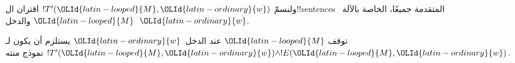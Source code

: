 \documentclass[../../../include/open-logic-section]{subfiles}
\begin{document}
\begin{enumerate}
\end{enumerate}
ولنسمّ $!T'({\OLId{latin-looped}{M}},{\OLId{latin-ordinary}{w}})$ اقتران ال!!{sentence}s المتقدمة جميعًا،
الخاصة بالآلة~${\OLId{latin-looped}{M}}$ والدخل~${\OLId{latin-ordinary}{w}}$.

\begin{lem}
  توقف ${\OLId{latin-looped}{M}}$ عند الدخل~${\OLId{latin-ordinary}{w}}$ يستلزم أن يكون لـ
  $!T'({\OLId{latin-looped}{M}},{\OLId{latin-ordinary}{w}})\land !E({\OLId{latin-looped}{M}},{\OLId{latin-ordinary}{w}})$ نموذج منته.
\end{lem}
\end{document}
